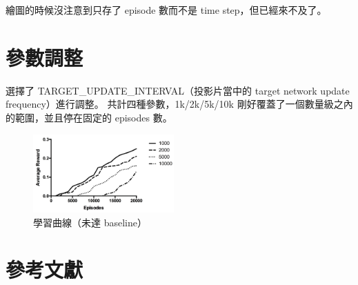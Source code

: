 \documentclass[final,3p]{elsarticle}
\begin{document}
	繪圖的時候沒注意到只存了 episode 數而不是 time step，但已經來不及了。
		
\section{參數調整}
	選擇了 TARGET\_UPDATE\_INTERVAL（投影片當中的 target network update frequency）進行調整。
	共計四種參數，1k/2k/5k/10k 剛好覆蓋了一個數量級之內的範圍，並且停在固定的 episodes 數。
	\begin{figure}[H]
		\centering
		\includegraphics[width=0.48\textwidth]{images/dqn_update}
		\caption{學習曲線（未達 baseline）} \label{fig:dqn_update}
	\end{figure}
		


%  
% 
% 
% 
% 
% 
% 
% 
% 
% 
% 
% 
% 

\section{參考文獻}


	
\end{document}
